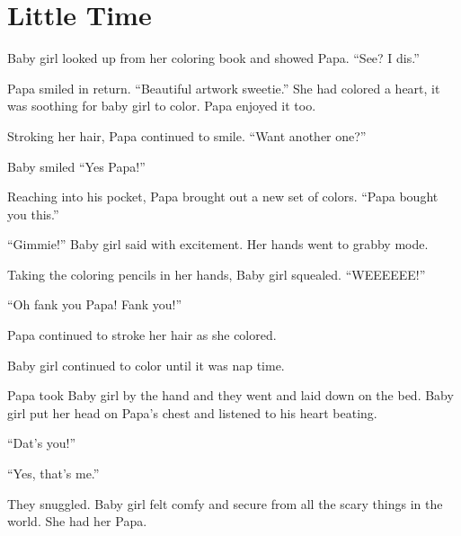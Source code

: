 \section{Little Time}

    Baby girl looked up from her coloring book and showed Papa. “See? I dis.”

    Papa smiled in return. “Beautiful artwork sweetie.” She had colored a heart, it was soothing for baby girl to color. Papa enjoyed it too.

    Stroking her hair, Papa continued to smile. “Want another one?”

    Baby smiled “Yes Papa!”

    Reaching into his pocket, Papa brought out a new set of colors. “Papa bought you this.”

    “Gimmie!” Baby girl said with excitement. Her hands went to grabby mode.

    Taking the coloring pencils in her hands, Baby girl squealed. “WEEEEEE!”

    “Oh fank you Papa! Fank you!”

    Papa continued to stroke her hair as she colored.

    Baby girl continued to color until it was nap time.

    Papa took Baby girl by the hand and they went and laid down on the bed. Baby girl put her head on Papa’s chest and listened to his heart beating.

    “Dat’s you!”

    “Yes, that’s me.”

    They snuggled. Baby girl felt comfy and secure from all the scary things in the world. She had her Papa.

